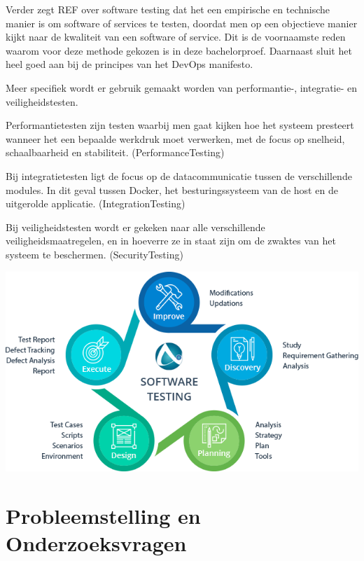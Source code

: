 Verder zegt REF over software testing dat het een empirische en technische manier is om software of services te testen, doordat men op een objectieve manier kijkt naar de kwaliteit van een software of service. Dit is de voornaamste reden waarom voor deze methode gekozen is in deze bachelorproef. Daarnaast sluit het heel goed aan bij de principes van het DevOps manifesto.

Meer specifiek wordt er gebruik gemaakt worden van performantie-, integratie- en veiligheidstesten.

Performantietesten zijn testen waarbij men gaat kijken hoe het systeem presteert wanneer het een bepaalde werkdruk moet verwerken, met de focus op snelheid, schaalbaarheid en stabiliteit. (PerformanceTesting)

Bij integratietesten ligt de focus op de datacommunicatie tussen de verschillende modules. In dit geval tussen Docker, het besturingssysteem van de host en de uitgerolde applicatie. (IntegrationTesting)

Bij veiligheidstesten wordt er gekeken naar alle verschillende veiligheidsmaatregelen, en in hoeverre ze in staat zijn om de zwaktes van het systeem te beschermen. (SecurityTesting)

\begin{center}
	\includegraphics[scale=0.5]{img/testingprocess.png}
\end{center}

\section{Probleemstelling en Onderzoeksvragen}
\label{sec:onderzoeksvragen}


